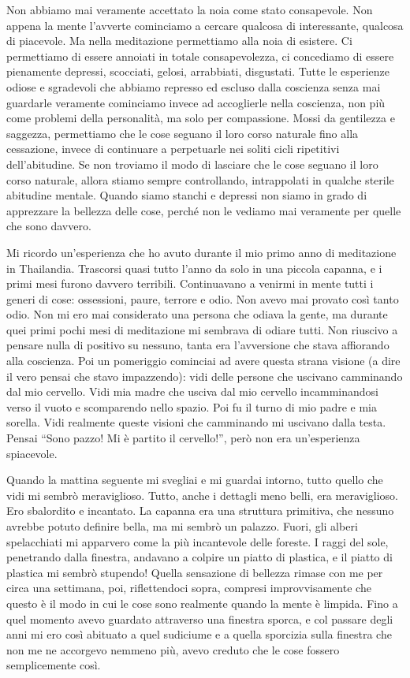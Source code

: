 Non abbiamo mai veramente accettato la noia come stato consapevole. Non
appena la mente l'avverte cominciamo a cercare qualcosa di interessante,
qualcosa di piacevole. Ma nella meditazione permettiamo alla noia di
esistere. Ci permettiamo di essere annoiati in totale consapevolezza, ci
concediamo di essere pienamente depressi, scocciati, gelosi, arrabbiati,
disgustati. Tutte le esperienze odiose e sgradevoli che abbiamo represso
ed escluso dalla coscienza senza mai guardarle veramente cominciamo
invece ad accoglierle nella coscienza, non più come problemi della
personalità, ma solo per compassione. Mossi da gentilezza e saggezza,
permettiamo che le cose seguano il loro corso naturale fino alla
cessazione, invece di continuare a perpetuarle nei soliti cicli
ripetitivi dell'abitudine. Se non troviamo il modo di lasciare che le
cose seguano il loro corso naturale, allora stiamo sempre controllando,
intrappolati in qualche sterile abitudine mentale. Quando siamo stanchi
e depressi non siamo in grado di apprezzare la bellezza delle cose,
perché non le vediamo mai veramente per quelle che sono davvero.

Mi ricordo un'esperienza che ho avuto durante il mio primo anno di
meditazione in Thailandia. Trascorsi quasi tutto l'anno da solo in una
piccola capanna, e i primi mesi furono davvero terribili. Continuavano a
venirmi in mente tutti i generi di cose: ossessioni, paure, terrore e
odio. Non avevo mai provato così tanto odio. Non mi ero mai considerato
una persona che odiava la gente, ma durante quei primi pochi mesi di
meditazione mi sembrava di odiare tutti. Non riuscivo a pensare nulla di
positivo su nessuno, tanta era l'avversione che stava affiorando alla
coscienza. Poi un pomeriggio cominciai ad avere questa strana visione (a
dire il vero pensai che stavo impazzendo): vidi delle persone che
uscivano camminando dal mio cervello. Vidi mia madre che usciva dal mio
cervello incamminandosi verso il vuoto e scomparendo nello spazio. Poi
fu il turno di mio padre e mia sorella. Vidi realmente queste visioni
che camminando mi uscivano dalla testa. Pensai ``Sono pazzo! Mi è
partito il cervello!'', però non era un'esperienza spiacevole.

Quando la mattina seguente mi svegliai e mi guardai intorno, tutto
quello che vidi mi sembrò meraviglioso. Tutto, anche i dettagli meno
belli, era meraviglioso. Ero sbalordito e incantato. La capanna era una
struttura primitiva, che nessuno avrebbe potuto definire bella, ma mi
sembrò un palazzo. Fuori, gli alberi spelacchiati mi apparvero come la
più incantevole delle foreste. I raggi del sole, penetrando dalla
finestra, andavano a colpire un piatto di plastica, e il piatto di
plastica mi sembrò stupendo! Quella sensazione di bellezza rimase con me
per circa una settimana, poi, riflettendoci sopra, compresi
improvvisamente che questo è il modo in cui le cose sono realmente
quando la mente è limpida. Fino a quel momento avevo guardato attraverso
una finestra sporca, e col passare degli anni mi ero così abituato a
quel sudiciume e a quella sporcizia sulla finestra che non me ne
accorgevo nemmeno più, avevo creduto che le cose fossero semplicemente
così.

